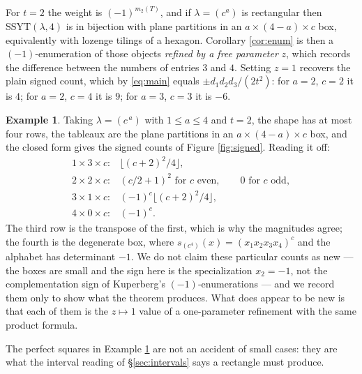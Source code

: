 \documentclass[11pt,reqno]{amsart}
\theoremstyle{plain}
\theoremstyle{definition}
\newtheorem{example}[theorem]{Example}
\begin{document}
For $t=2$ the weight is $(-1)^{m_2(T)}$, and if $\lambda=(c^a)$ is rectangular then
$\mathrm{SSYT}(\lambda,4)$ is in bijection with plane partitions in an $a\times(4-a)\times c$ box,
equivalently with lozenge tilings of a hexagon. Corollary \ref{cor:enum} is then a
$(-1)$-enumeration of those objects \emph{refined by a free parameter} $z$, which records the
difference between the numbers of entries $3$ and $4$. Setting $z=1$ recovers the plain signed
count, which by \eqref{eq:main} equals $\pm d_1d_2d_3/(2t^2)$: for $a=2$, $c=2$ it is $4$; for
$a=2$, $c=4$ it is $9$; for $a=3$, $c=3$ it is $-6$.

\begin{example}\label{ex:boxes}
Taking $\lambda=(c^{\,a})$ with $1\le a\le4$ and $t=2$, the shape has at most four rows, the tableaux
are the plane partitions in an $a\times(4-a)\times c$ box, and the closed form gives the signed
counts of Figure \ref{fig:signed}. Reading it off:
\[
\begin{array}{ll}
1\times3\times c: & \bigl\lfloor (c+2)^2/4\bigr\rfloor,\\[2pt]
2\times2\times c: & (c/2+1)^2 \text{ for } c \text{ even},\qquad 0 \text{ for } c \text{ odd},\\[2pt]
3\times1\times c: & (-1)^c\bigl\lfloor (c+2)^2/4\bigr\rfloor,\\[2pt]
4\times0\times c: & (-1)^c .
\end{array}
\]
The third row is the transpose of the first, which is why the magnitudes agree; the fourth is the
degenerate box, where $s_{(c^4)}(x)=(x_1x_2x_3x_4)^c$ and the alphabet has determinant $-1$. We do
not claim these particular counts as new --- the boxes are small and the sign here is the
specialization $x_2=-1$, not the complementation sign of Kuperberg's $(-1)$-enumerations --- and we
record them only to show what the theorem produces. What does appear to be new is that each of them
is the $z\mapsto1$ value of a one-parameter refinement with the same product formula.
\end{example}

The perfect squares in Example \ref{ex:boxes} are not an accident of small cases: they are what the
interval reading of \S\ref{sec:intervals} says a rectangle must produce.
\end{document}

